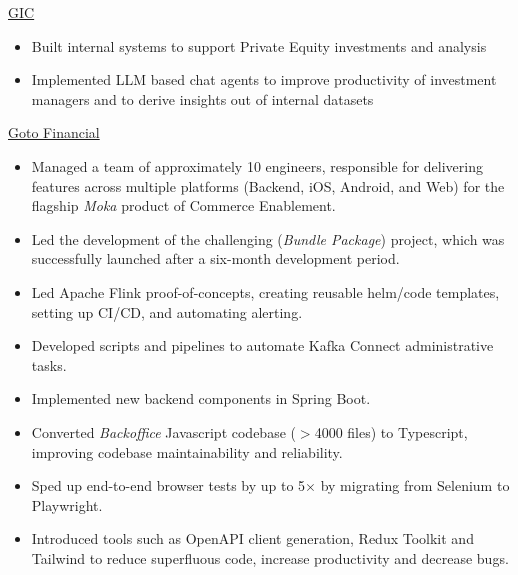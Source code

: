 \documentclass[]{cv} %
\begin{document}
\entry
{\href{https://www.gic.com.sg/}{GIC}}
{
\begin{itemize}
\item Built internal systems to support Private Equity investments and analysis
\item Implemented LLM based chat agents to improve productivity of investment managers and to derive insights out of internal datasets
\end{itemize}
}


\entry
{\href{https://gotofinancial.com/en}{Goto Financial}}
{
\begin{itemize}
\item Managed a team of approximately 10 engineers, responsible for delivering features across multiple platforms (Backend, iOS, Android, and Web) for the flagship \emph{Moka} product of Commerce Enablement.
\item Led the development of the challenging (\emph{Bundle Package}) project, which was successfully launched after a six-month development period.
\item Led Apache Flink proof-of-concepts, creating reusable helm/code templates, setting up CI/CD, and automating alerting.
\item Developed scripts and pipelines to automate Kafka Connect administrative tasks.
\item Implemented new backend components in Spring Boot.
\item Converted \emph{Backoffice} Javascript codebase ($> $4000 files) to Typescript, improving codebase maintainability and reliability.
\item Sped up end-to-end browser tests by up to 5$\times$ by migrating from Selenium to Playwright.
\item Introduced tools such as OpenAPI client generation, Redux Toolkit and Tailwind to reduce superfluous code, increase productivity and decrease bugs.
\end{itemize}
}
\end{document}
